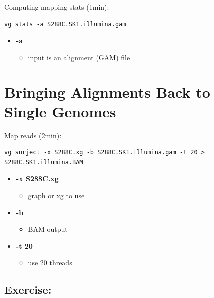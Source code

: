 \documentclass[
]{book}
\providecommand{\tightlist}{%
  \setlength{\itemsep}{0pt}\setlength{\parskip}{0pt}}
\begin{document}
Computing mapping stats (1min):

\begin{verbatim}
vg stats -a S288C.SK1.illumina.gam
\end{verbatim}

\begin{itemize}
\tightlist
\item
  \textbf{-a}

  \begin{itemize}
  \tightlist
  \item
    input is an alignment (GAM) file
  \end{itemize}
\end{itemize}

\hypertarget{bringing-alignments-back-to-single-genomes}{%
\section{Bringing Alignments Back to Single Genomes}\label{bringing-alignments-back-to-single-genomes}}

Map reads (2min):

\begin{verbatim}
vg surject -x S288C.xg -b S288C.SK1.illumina.gam -t 20 > S288C.SK1.illumina.BAM
\end{verbatim}

\begin{itemize}
\tightlist
\item
  \textbf{-x S288C.xg}

  \begin{itemize}
  \tightlist
  \item
    graph or xg to use
  \end{itemize}
\item
  \textbf{-b}

  \begin{itemize}
  \tightlist
  \item
    BAM output
  \end{itemize}
\item
  \textbf{-t 20}

  \begin{itemize}
  \tightlist
  \item
    use 20 threads
  \end{itemize}
\end{itemize}

\hypertarget{exercise-1}{%
\subsection*{\texorpdfstring{\textbf{Exercise:}}{Exercise:}}\label{exercise-1}}
\end{document}
